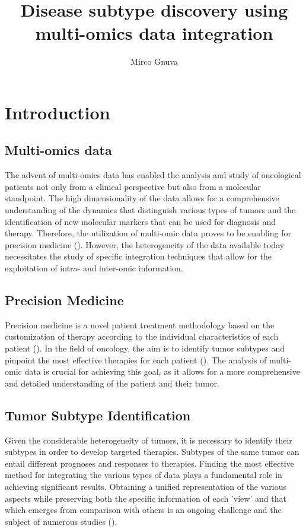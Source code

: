 \documentclass[12pt,a4paper]{article}
\title{Disease subtype discovery using multi-omics data integration}
\author{Mirco Gnuva}
\begin{document}
\maketitle
\tableofcontents


\pagebreak
\section{Introduction}\label{sec:intro}
\subsection{Multi-omics data}
The advent of multi-omics data has enabled the analysis and study of oncological patients not only from a clinical perspective but also from a molecular standpoint. The high dimensionality of the data allows for a comprehensive understanding of the dynamics that distinguish various types of tumors and the identification of new molecular markers that can be used for diagnosis and therapy. Therefore, the utilization of multi-omic data proves to be enabling for precision medicine (\cite{CorreaAguila2022}).
However, the heterogeneity of the data available today necessitates the study of specific integration techniques that allow for the exploitation of intra- and inter-omic information.


\subsection{Precision Medicine}
Precision medicine is a novel patient treatment methodology based on the customization of therapy according to the individual characteristics of each patient (\cite{Ginsburg2001}). In the field of oncology, the aim is to identify tumor subtypes and pinpoint the most effective therapies for each patient (\cite{Jiang2022}). The analysis of multi-omic data is crucial for achieving this goal, as it allows for a more comprehensive and detailed understanding of the patient and their tumor.

\subsection{Tumor Subtype Identification}
Given the considerable heterogeneity of tumors, it is necessary to identify their subtypes in order to develop targeted therapies. Subtypes of the same tumor can entail different prognoses and responses to therapies. Finding the most effective method for integrating the various types of data plays a fundamental role in achieving significant results. Obtaining a unified representation of the various aspects while preserving both the specific information of each 'view' and that which emerges from comparison with others is an ongoing challenge and the subject of numerous studies (\cite{Wrheide2021}).
\end{document}
